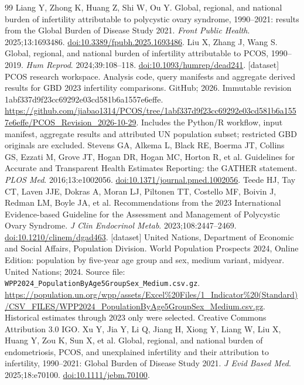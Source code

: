 \documentclass[11pt,a4paper]{article}
\begin{document}
{\begin{thebibliography}{99}
Liang Y, Zhong K, Huang Z, Shi W, Ou Y. Global, regional, and national burden of infertility attributable to polycystic ovary syndrome, 1990--2021: results from the Global Burden of Disease Study 2021. \emph{Front Public Health}. 2025;13:1693486. \href{https://doi.org/10.3389/fpubh.2025.1693486}{doi:10.3389/fpubh.2025.1693486}.
Liu X, Zhang J, Wang S. Global, regional, and national burden of infertility attributable to PCOS, 1990--2019. \emph{Hum Reprod}. 2024;39:108--118. \href{https://doi.org/10.1093/humrep/dead241}{doi:10.1093/humrep/dead241}.
[dataset] PCOS research workspace. Analysis code, query manifests and aggregate derived results for GBD 2023 infertility comparisons. GitHub; 2026. Immutable revision 1abf337d9f23cc69292e03cd581b6a1557e6effe. \url{https://github.com/jiabao1314/PCOS/tree/1abf337d9f23cc69292e03cd581b6a1557e6effe/PCOS_Revision_2026-10-29}. Includes the Python/R workflow, input manifest, aggregate results and attributed UN population subset; restricted GBD originals are excluded.
Stevens GA, Alkema L, Black RE, Boerma JT, Collins GS, Ezzati M, Grove JT, Hogan DR, Hogan MC, Horton R, et al. Guidelines for Accurate and Transparent Health Estimates Reporting: the GATHER statement. \emph{PLOS Med}. 2016;13:e1002056. \href{https://doi.org/10.1371/journal.pmed.1002056}{doi:10.1371/journal.pmed.1002056}.
Teede HJ, Tay CT, Laven JJE, Dokras A, Moran LJ, Piltonen TT, Costello MF, Boivin J, Redman LM, Boyle JA, et al. Recommendations from the 2023 International Evidence-based Guideline for the Assessment and Management of Polycystic Ovary Syndrome. \emph{J Clin Endocrinol Metab}. 2023;108:2447--2469. \href{https://doi.org/10.1210/clinem/dgad463}{doi:10.1210/clinem/dgad463}.
[dataset] United Nations, Department of Economic and Social Affairs, Population Division. World Population Prospects 2024, Online Edition: population by five-year age group and sex, medium variant, midyear. United Nations; 2024. Source file: \texttt{WPP2024\_PopulationByAge5GroupSex\_Medium.csv.gz}. \url{https://population.un.org/wpp/assets/Excel%20Files/1_Indicator%20(Standard)/CSV_FILES/WPP2024_PopulationByAge5GroupSex_Medium.csv.gz}. Historical estimates through 2023 only were selected. Creative Commons Attribution 3.0 IGO.
Xu Y, Jia Y, Li Q, Jiang H, Xiong Y, Liang W, Liu X, Huang Y, Zou K, Sun X, et al. Global, regional, and national burden of endometriosis, PCOS, and unexplained infertility and their attribution to infertility, 1990--2021: Global Burden of Disease Study 2021. \emph{J Evid Based Med}. 2025;18:e70100. \href{https://doi.org/10.1111/jebm.70100}{doi:10.1111/jebm.70100}.
\end{thebibliography}
}
\clearpage
\end{document}
